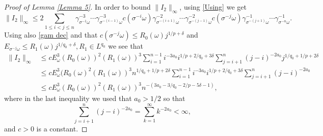 \documentclass[11pt,reqno,a4paper]{article}
\theoremstyle{special}
\def\om{\omega}
\begin{document}
\begin{proof}[Proof of Lemma \ref{Lemma 5}]
In order to bound $\|I_2\|_\infty$, using \eqref{Using} we get 
  $$
\|I_2\|_\infty\leq 2\sum_{1\leq i<j\leq n}\gamma_{\sigma^{-1}\om}^{-3}\cdots \gamma_{\sigma^{-(i-1)}\om}^{-3}c(\sigma^{-i}\om)\gamma_{\sigma^{-(i+1)}\om}^{-2}\cdots \gamma_{\sigma^{-(j-1)}\om}^{-2}c(\sigma^{-j}\om)\gamma_{\sigma^{-(j+1)}\om}^{-1}\cdots \gamma_{\sigma^{-n}\omega}^{-1}.
$$
Using also \eqref{gam dec} and that $c(\sigma^{-j}\om)\leq R_0(\om)j^{1/p+\delta}$ and $E_{\sigma^{-j}\om}\leq R_1(\om)j^{1/q_0+\delta}, R_1\in L^{q_0}$
we see that 
\[
\begin{split}
\|I_2\|_\infty &\leq cE_\om^3(R_0(\om))^2 (R_1(\om))^3\sum_{i=1}^{n-1}i^{-3a_0}i^{1/p+2/q_0+3\delta}\sum_{j=i+1}^n(j-i)^{-2a_0}j^{1/q_0+1/p+2\delta} \\
 &\le cE_\om^3(R_0(\om)^2 (R_1(\om))^3n^{1/q_0+1/p
 +2\delta}\sum_{i=1}^{n-1}i^{-3a_0}i^{1/p+2/q_0+3\delta}\sum_{j=i+1}^n(j-i)^{-2a_0} \\
 &\leq cE_\om^3(R_0(\om))^2 (R_1(\om))^3n^{-(3a_0-3/q_0-2/p-5\delta-1)},
\end{split}
\]
where in the last inequality we used that $a_0>1/2$ so that 
$$
\sum_{j=i+1}^n(j-i)^{-2a_0}= \sum_{k=1}^\infty k^{-2a_0}<\infty,
$$
and $c>0$ is a constant.


\end{proof}
\end{document}
